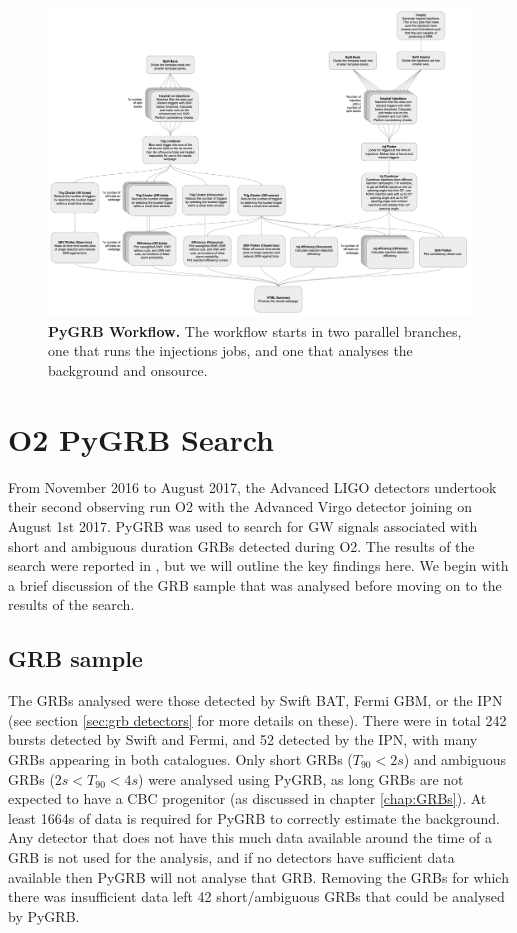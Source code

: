 \documentclass[11pt]{cuthesis}
\begin{document}
\begin{figure} %
\begin{center}
\includegraphics[width=1.0\linewidth]{pygrb_flowchart.png}
\end{center}
\caption{\textbf{PyGRB Workflow.} The workflow starts in two parallel branches, one that runs the injections jobs, and one that analyses the background and onsource. }
\label{fig:pygrb flowchart}
\end{figure}

\section{O2 PyGRB Search} \label{sec:pygrb o2 results}
From November 2016 to August 2017, the Advanced LIGO detectors undertook their second observing run O2 with the Advanced Virgo detector joining on August 1st 2017. PyGRB was used to search for GW signals associated with short and ambiguous duration GRBs detected during O2. The results of the search were reported in \cite{o2grb}, but we will outline the key findings here. We begin with a brief discussion of the GRB sample that was analysed before moving on to the results of the search.

\subsection{GRB sample}
The GRBs analysed were those detected by Swift BAT, Fermi GBM, or the IPN (see section \ref{sec:grb detectors} for more details on these). There were in total 242 bursts detected by Swift and Fermi, and 52 detected by the IPN, with many GRBs appearing in both catalogues. Only short GRBs ($T_{90}<2s$) and ambiguous GRBs ($2s<T_{90}<4s$) were analysed using PyGRB, as long GRBs are not expected to have a CBC progenitor (as discussed in chapter \ref{chap:GRBs}). At least 1664s of data is required for PyGRB to correctly estimate the background. Any detector that does not have this much data available around the time of a GRB is not used for the analysis, and if no detectors have sufficient data available then PyGRB will not analyse that GRB. Removing the GRBs for which there was insufficient data left 42 short/ambiguous GRBs that could be analysed by PyGRB.
\end{document}
